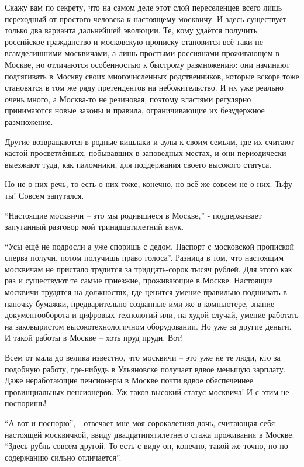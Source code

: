 Скажу вам по секрету, что на самом деле этот слой переселенцев всего лишь
переходный от простого человека к настоящему москвичу. И здесь существует
только два варианта дальнейшей эволюции. Те, кому удаётся получить российское
гражданство и московскую прописку становится всё-таки не всамделишними
москвичами, а лишь простыми россиянами проживающем в Москве, но отличаются
особенностью к быстрому размножению: они начинают подтягивать в Москву своих
многочисленных родственников, которые вскоре тоже становятся в том же ряду
претендентов на небожительство. И их уже реально очень много, а Москва-то не
резиновая, поэтому властями регулярно принимаются новые законы и правила,
ограничивающие их безудержное размножение.


Другие возвращаются в родные кишлаки и аулы к своим семьям, где их считают
кастой просветлённых, побывавших в заповедных местах, и они периодически
выезжают туда, как паломники, для поддержания своего высокого статуса.

Но не о них речь, то есть о них тоже, конечно, но всё же совсем не о них. Тьфу
ты! Совсем запутался.

\enquote{Настоящие москвичи – это мы родившиеся в Москве,} - поддерживает запутанный
разговор мой тринадцатилетний внук.

\enquote{Усы ещё не подросли а уже споришь с дедом. Паспорт с московской пропиской
сперва получи, потом получишь право голоса}. Разница в том, что настоящим
москвичам не пристало трудится за тридцать-сорок тысяч рублей. Для этого как
раз и существуют те самые приезжие, проживающие в Москве. Настоящие москвичи
трудятся на должностях, где ценится умение правильно подшивать в папочку
бумажки, предварительно созданные ими же в компьютере, знание документооборота
и цифровых технологий или, на худой случай, умение работать на заковыристом
высокотехнологичном оборудовании. Но уже за другие деньги. И такой работы в
Москве – хоть пруд пруди. Вот!

Всем от мала до велика известно, что москвичи – это уже не те люди, кто за
подобную работу, где-нибудь в Ульяновске получает вдвое меньшую зарплату. Даже
неработающие пенсионеры в Москве почти вдвое обеспеченнее провинциальных
пенсионеров. Уж таков высокий статус москвича! И с этим не поспоришь!

\enquote{А вот и поспорю}, - отвечает мне моя сорокалетняя дочь, считающая себя
настоящей москвичкой, ввиду двадцатипятилетнего стажа проживания в Москве.
\enquote{Здесь рубль совсем другой. То есть с виду он, конечно, такой же точно, но по
содержанию сильно отличается}.

